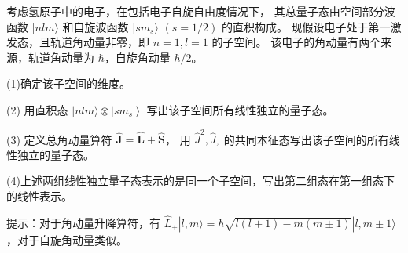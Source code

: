 \begin{3}
    考虑氢原子中的电子，在包括电子自旋自由度情况下，
    其总量子态由空间部分波函数 $|n l m\rangle$ 和自旋波函数 $|s m_{s}\rangle$ $(s=1 / 2)$ 的直积构成。
    现假设电子处于第一激发态，且轨道角动量非零，即 $n=1, l=1$ 的子空间。
    该电子的角动量有两个来源，轨道角动量为 $\hbar$，自旋角动量 $\hbar/2$。

(1)确定该子空间的维度。

(2) 用直积态 $|n l m\rangle \otimes\left|s m_{s}\right\rangle$ 写出该子空间所有线性独立的量子态。

(3) 定义总角动量算符 $\hat{\mathbf{J}}=\hat{\mathbf{L}}+\hat{\mathbf{S}}$，
用 $\hat{J}^{2}, \hat{J}_{z}$ 的共同本征态写出该子空间的所有线性独立的量子态。

(4)上述两组线性独立量子态表示的是同一个子空间，写出第二组态在第一组态下的线性表示。

提示：对于角动量升降算符，有 $\hat{L}_{ \pm}|l, m\rangle=\hbar \sqrt{l(l+1)-m(m \pm 1)}|l, m \pm 1\rangle$，对于自旋角动量类似。
\end{3}
